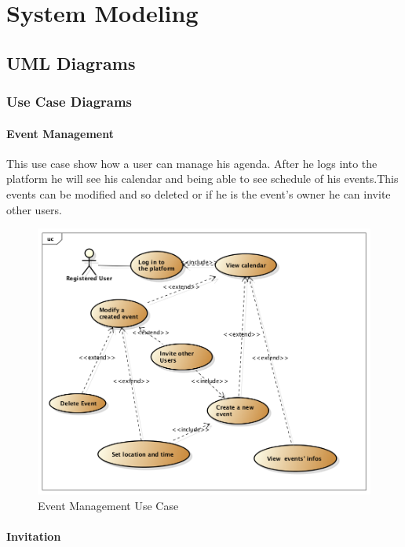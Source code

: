 \chapter{System Modeling} \label{cap:cap4}
\section{UML Diagrams}
\subsection{Use Case Diagrams}
\subsubsection{Event Management}
This use case show how a user can manage his agenda. After he logs into the platform he will see his calendar and being able to see schedule of his events.This events can be modified and so deleted or if he is the event's owner he can invite other users. 
 \begin{center}
 \begin{figure}
    \includegraphics[width=1\textwidth]{../UMLDiagram/use_case/EventManagmentUseCase/EventManagment.png}
    \caption{Event Management Use Case}
     \label{fig:eventusecase}
     \end{figure}
   \end{center}  
\subsubsection{Invitation}
